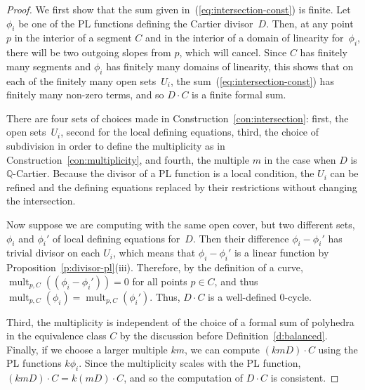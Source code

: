 \documentclass[11pt,reqno]{amsart}
\theoremstyle{definition}
\newcommand{\mult}{\operatorname{mult}}
\newcommand{\QQ}{\mathbb Q}
\begin{document}
\begin{proof}
We first show that the sum given in~(\ref{eq:intersection-const}) is finite.
Let $\phi_i$ be one of the PL functions defining the Cartier divisor~$D$. Then,
at any point~$p$ in the interior of a segment $C$ and in the interior of a
domain of linearity for~$\phi_i$, there will be two outgoing slopes from $p$,
which will cancel. Since $C$ has finitely many segments and $\phi_i$ has
finitely many domains of linearity, this shows that on each of the finitely many
open sets~$U_i$, the sum~(\ref{eq:intersection-const}) has finitely many
non-zero terms, and so $D \cdot C$ is a finite formal sum.

There are four sets of choices made in Construction~\ref{con:intersection}:
first, the open sets~$U_i$, second for the local defining equations, third, the
choice of subdivision in order to define the multiplicity as in
Construction~\ref{con:multiplicity}, and fourth,
the multiple $m$ in the case when $D$ is $\QQ$-Cartier. Because
the divisor of a PL function is a local condition, the $U_i$ can be refined and
the defining equations replaced by their restrictions without changing the
intersection. 

Now suppose we are computing
with the same open cover, but two different sets, $\phi_i$ and $\phi_i'$ of
local defining equations for~$D$. Then their difference $\phi_i - \phi_i'$ has
trivial divisor on each $U_i$, which means that $\phi_i - \phi_i'$
is a linear function by Proposition~\ref{p:divisor-pl}(iii).
Therefore, by the definition of a curve, $\mult_{p,C}((\phi_i - \phi_i')) =
0$ for all points $p \in C$, and thus $\mult_{p,C}(\phi_i) =
\mult_{p,C}(\phi_i')$. Thus, $D \cdot C$ is a well-defined $0$-cycle.

Third, the multiplicity is independent of the choice of a formal sum of
polyhedra in the equivalence class $C$ by the discussion before
Definition~\ref{d:balanced}. Finally, if we choose a larger multiple $km$, we
can compute $(kmD) \cdot C$ using the PL functions $k \phi_i$. Since the
multiplicity scales with the PL function, $(kmD) \cdot C = k (mD) \cdot C$, and
so the computation of $D \cdot C$ is consistent.
\end{proof}
\end{document}
